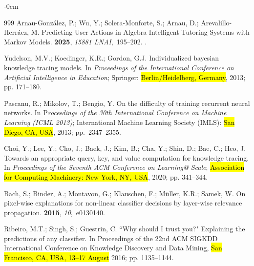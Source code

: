\documentclass[applsci,article,accept,moreauthors,pdftex]{Definitions/mdpi}
\begin{document}
\begin{adjustwidth}{-\extralength}{0cm}
\begin{thebibliography}{999}
Arnau-González, P.; Wu, Y.; Solera-Monforte, S.; Arnau, D.;
  Arevalillo-Herráez, M.
\newblock Predicting User Actions in Algebra Intelligent Tutoring Systems
  with Markov Models.
 {\bf 2025}, {\em 15881
  LNAI},~195–202.
.

Yudelson, M.V.; Koedinger, K.R.; Gordon, G.J.
\newblock Individualized bayesian knowledge tracing models.
\newblock In \textit{Proceedings of the International Conference on Artificial
  Intelligence in Education}; Springer: \hl{Berlin/Heidelberg, Germany},  2013; pp. 171--180.

Pascanu, R.; Mikolov, T.; Bengio, Y.
\newblock On the difficulty of training recurrent neural networks.
\newblock In P\textit{roceedings of the 30th International
  Conference on Machine Learning (ICML 2013)}; International Machine Learning
  Society (IMLS): \hl{San Diego, CA, USA},  2013; \mbox{pp. 2347--2355}.


Choi, Y.; Lee, Y.; Cho, J.; Baek, J.; Kim, B.; Cha, Y.; Shin, D.; Bae, C.; Heo,
  J.
\newblock Towards an appropriate query, key, and value computation for
  knowledge tracing.
\newblock In \textit{Proceedings of the Seventh ACM Conference on
  Learning@ Scale}; \hl{Association for Computing Machinery: New York, NY, USA}, 2020; pp. 341--344.

Bach, S.; Binder, A.; Montavon, G.; Klauschen, F.; M{\"u}ller, K.R.; Samek, W.
\newblock On pixel-wise explanations for non-linear classifier decisions by
  layer-wise relevance propagation.
 {\bf 2015}, {\em 10},~e0130140.

Ribeiro, M.T.; Singh, S.; Guestrin, C.
\newblock ``Why should I trust you?" Explaining the predictions of any
  classifier.
\newblock In Proceedings of the 22nd ACM SIGKDD
  International Conference on Knowledge Discovery and Data Mining, \hl{San Francisco, CA, USA, 13--17 August} 2016; pp.
  1135--1144.


\end{thebibliography}
\end{adjustwidth}
\end{document}
